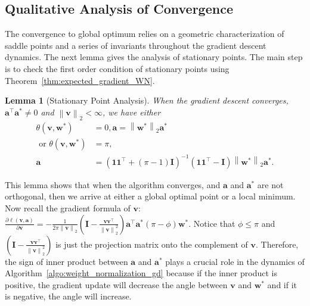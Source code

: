 \documentclass{article}
\newcommand{\firstlayer}{w}
\newcommand{\firstlayerWN}{v}
\newcommand{\secondlayer}{a}
\newcommand{\mat}[1]{\mathbf{#1}}
\newcommand{\vect}[1]{\mathbf{#1}}
\newcommand{\norm}[1]{\left\|#1\right\|}
\newtheorem{lem}{Lemma}[section]
\begin{document}
\subsection{Qualitative Analysis of Convergence}\label{sec:proof_sketch_qualitative}
The convergence to global optimum relies on a geometric characterization of saddle points and a series of invariants throughout the gradient descent dynamics.
The next lemma gives the analysis of stationary points.
The main step is to check the first order condition of stationary points using Theorem~\ref{thm:expected_gradient_WN}.
\begin{lem}[Stationary Point Analysis]\label{lem:stationary_point}
When the gradient descent converges, $\vect{\secondlayer}^\top \vect{\secondlayer}^* \neq 0$ and $\norm{\vect{\firstlayerWN}}_2 < \infty$, we have either \begin{align*}
\theta\left(\vect{\firstlayerWN},\vect{\firstlayer}^*\right) &= 0, \vect{\secondlayer} = \norm{\vect{\firstlayer}^*}_2\vect{\secondlayer}^* \\
\text{ or }
\theta\left(\vect{\firstlayerWN},\vect{\firstlayer}^*\right) &= \pi, \\\vect{\secondlayer} &= \left(\vect{1}\vect{1}^\top + \left(\pi-1\right)\mat{I}\right)^{-1}\left(\vect{1}\vect{1}^\top - \mat{I}\right)\norm{\vect{\firstlayer}^*}_2\vect{\secondlayer}^*.
\end{align*}
\end{lem}
This lemma shows that when the algorithm converges, and $\vect{\secondlayer}$ and $\vect{\secondlayer}^*$ are not orthogonal, then we arrive at either a global optimal point or a local minimum.
Now recall the gradient formula of $\vect{\firstlayerWN}$:
$\frac{\partial \ell\left(\vect{\firstlayerWN},\vect{\secondlayer}\right)}{\partial \vect{\firstlayerWN}}=
-\frac{1}{2\pi\norm{\vect{\firstlayerWN}}_2}\left(\mat{I}-\frac{\vect{\firstlayerWN}\vect{\firstlayerWN}^\top}{\norm{\vect{\firstlayerWN}}_2^2}\right)\vect{\secondlayer}^\top \vect{\secondlayer}^*\left(\pi-\phi\right)\vect{w}^*$.
Notice that $\phi \le \pi$ and $\left(\mat{I}-\frac{\vect{\firstlayerWN}\vect{\firstlayerWN}^\top}{\norm{\vect{\firstlayerWN}}_2^2}\right)$ is just the projection matrix onto the complement of $\vect{\firstlayerWN}$.
Therefore, the sign of inner product between $\vect{\secondlayer}$ and $\vect{\secondlayer}^*$ plays a crucial role in the dynamics of Algorithm~\ref{algo:weight_normalization_gd} because if the inner product is positive, the gradient update will decrease the angle between $\vect{\firstlayerWN}$ and $\vect{\firstlayer}^*$ and if it is negative, the angle will increase.
\end{document}
